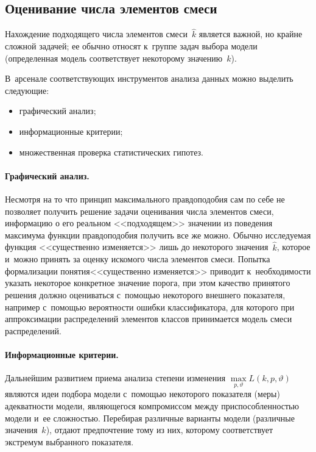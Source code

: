 \begin{multicols}{2}
\section{Оценивание числа элементов смеси}

     Нахождение подходящего числа элементов смеси~$\hat{k}$ является
важной, но крайне сложной задачей; ее обычно относят к~группе задач выбора
модели (определенная модель соответствует некоторому значению~$k$).

В~арсенале соответствующих инструментов анализа данных можно выделить
сле\-ду\-ющие:
     \begin{itemize}
\item графический анализ;
\item информационные критерии;
\item множественная проверка статистических гипотез.
\end{itemize}

\vspace*{-3pt}

     \paragraph*{Графический анализ.} Несмотря на то что принцип
максимального правдоподобия сам по себе не позволяет получить решение
задачи оценивания чис\-ла элементов смеси, информацию о его реальном
<<подходящем>> значении из поведения максимума функции правдоподобия
получить все же можно. Обычно исследуемая функция <<существенно
изменяется>> лишь до некоторого значения~$\hat{k}$, которое и~можно
принять за оценку искомого числа элементов смеси. Попытка формализации
понятия\linebreak <<существенно изменяется>> приводит к~не\-об\-хо\-ди\-мости указать
некоторое конкретное значение порога, при этом качество принятого решения
должно оцениваться с~по\-мощью некоторого внешнего\linebreak
 показателя, например с~помощью вероятности ошибки классификатора, для которого при
аппроксимации распределений элементов классов принимается модель смеси
распределений.

\vspace*{-3pt}

     \paragraph*{Информационные критерии.} Дальнейшим развитием
приема анализа степени изменения $\max\limits_{p,\vartheta} L(k,p,\vartheta)$
являются идеи подбора модели с~помощью некоторого показателя (меры)
адекватности модели, являющегося компромиссом между приспособленностью
модели и~ее сложностью. Перебирая различные варианты модели (различные
значения~$k$), отдают предпочтение тому из них, которому соответствует
экстремум выбранного показателя.


\end{multicols}
